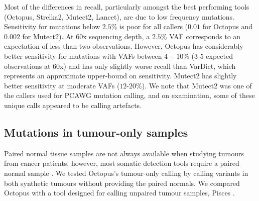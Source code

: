 \documentclass[notitlepage, twocolumn]{article}
\begin{document}
Most of the differences in recall, particularly amongst the best performing tools (Octopus, Strelka2, Mutect2, Lancet), are due to low frequency mutations. Sensitivity for mutations below $2.5\%$ is poor for all callers ($0.01$ for Octopus and $0.002$ for Mutect2). At 60x sequencing depth, a $2.5\%$ VAF corresponds to an expectation of less than two observations. However, Octopus has considerably better sensitivity for mutations with VAFs between $4-10\%$ ($3$-$5$ expected observations at 60x) and has only slightly worse recall than VarDict, which represents an approximate upper-bound on sensitivity. Mutect2 has slightly better sensitivity at moderate VAFs ($12$-$20\%$). We note that Mutect2 was one of the callers used for PCAWG mutation calling, and on examination, some of these unique calls appeared to be calling artefacts.

\subsection*{Mutations in tumour-only samples}

Paired normal tissue samples are not always available when studying tumours from cancer patients, however, most somatic detection tools require a paired normal sample \cite{RN604, RN601, RN600}. We tested Octopus's tumour-only calling by calling variants in both synthetic tumours without providing the paired normals. We compared Octopus with a tool designed for calling unpaired tumour samples, Pisces \cite{RN602}.
\end{document}
